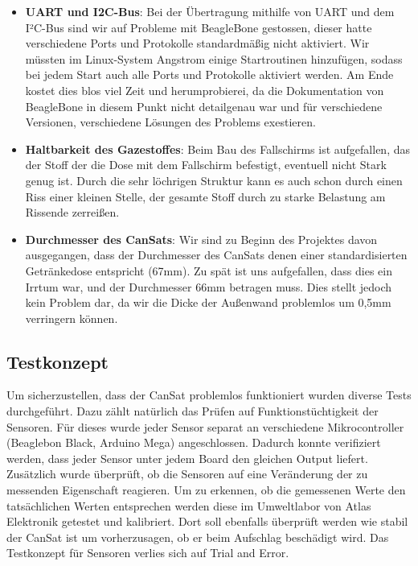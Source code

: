 \begin{itemize}
	\item \textbf{UART und I2C-Bus}: Bei der Übertragung mithilfe von UART und dem I²C-Bus sind wir auf Probleme mit BeagleBone gestossen, dieser hatte verschiedene Ports und Protokolle standardmäßig nicht aktiviert. Wir müssten im Linux-System Angstrom einige Startroutinen hinzufügen, sodass bei jedem Start auch alle Ports und Protokolle aktiviert werden. Am Ende kostet dies blos viel Zeit und herumprobierei, da die Dokumentation von BeagleBone in diesem Punkt nicht detailgenau war und für verschiedene Versionen, verschiedene Lösungen des Problems exestieren.
\item \textbf{Haltbarkeit des Gazestoffes}: Beim Bau des Fallschirms ist aufgefallen, das der Stoff der die Dose mit dem Fallschirm befestigt, eventuell nicht Stark genug ist. Durch die sehr löchrigen Struktur kann es auch schon durch einen Riss einer kleinen Stelle, der gesamte Stoff durch zu starke Belastung am Rissende zerreißen.
\item \textbf{Durchmesser des CanSats}: Wir sind zu Beginn des Projektes davon ausgegangen, dass der Durchmesser des CanSats denen einer standardisierten Getränkedose entspricht (67mm). Zu spät ist uns aufgefallen, dass dies ein Irrtum war, und der Durchmesser 66mm betragen muss. Dies stellt jedoch kein Problem dar, da wir die Dicke der Außenwand problemlos um 0,5mm verringern können.
\end{itemize}

\subsection{Testkonzept}

Um sicherzustellen, dass der CanSat problemlos funktioniert wurden diverse Tests durchgeführt. Dazu zählt natürlich das Prüfen auf Funktionstüchtigkeit der Sensoren. Für dieses wurde jeder Sensor separat an verschiedene Mikrocontroller (Beaglebon Black, Arduino Mega) angeschlossen. Dadurch konnte verifiziert werden, dass jeder Sensor unter jedem Board den gleichen Output liefert. Zusätzlich wurde überprüft, ob die Sensoren auf eine Veränderung der zu messenden Eigenschaft reagieren. Um zu erkennen, ob die gemessenen Werte den tatsächlichen Werten entsprechen werden diese im Umweltlabor von Atlas Elektronik getestet und kalibriert. Dort soll ebenfalls überprüft werden wie stabil der CanSat ist um vorherzusagen, ob er beim Aufschlag beschädigt wird. Das Testkonzept für Sensoren verlies sich auf Trial and Error.

